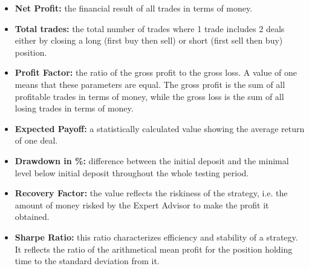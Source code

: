 \begin{itemize}
\setlength\itemsep{0.3em}
\item \textbf{Net Profit:} the financial result of all trades in terms of money.
\item \textbf{Total trades:} the total number of trades where 1 trade includes 2 deals either by closing a long (first buy then sell) or short (first sell then buy) position.
\item \textbf{Profit Factor:} the ratio of the gross profit to the gross loss. A value of one means that these parameters are equal. The gross profit is the sum of all profitable trades in terms of money, while the gross loss is the sum of all losing trades in terms of money.
\item \textbf{Expected Payoff:} a statistically calculated value showing the average return of one deal. 
\item \textbf{Drawdown in \%:} difference between the initial deposit and the minimal level below initial deposit throughout the whole testing period.
\item \textbf{Recovery Factor:} the value reflects the riskiness of the strategy, i.e. the amount of money risked by the Expert Advisor to make the profit it obtained.
\item \textbf{Sharpe Ratio:} this ratio characterizes efficiency and stability of a strategy. It reflects the ratio of the arithmetical mean profit for the position holding time to the standard deviation from it.
\end{itemize}





